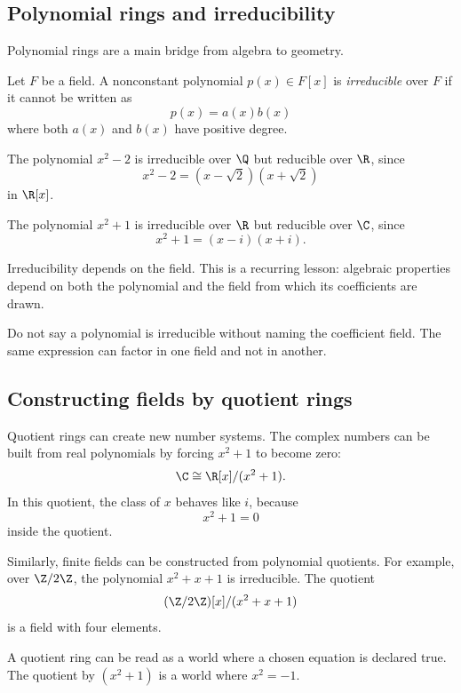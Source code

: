 \subsection{Polynomial rings and irreducibility}

Polynomial rings are a main bridge from algebra to geometry.

\begin{definition}
Let $F$ be a field. A nonconstant polynomial $p(x)\in F[x]$ is
\emph{irreducible} over $F$ if it cannot be written as
\[
p(x)=a(x)b(x)
\]
where both $a(x)$ and $b(x)$ have positive degree.
\end{definition}

\begin{example}
The polynomial $x^2-2$ is irreducible over $\Q$ but reducible over $\R$, since
\[
x^2-2=(x-\sqrt2)(x+\sqrt2)
\]
in $\R[x]$.
\end{example}

\begin{example}
The polynomial $x^2+1$ is irreducible over $\R$ but reducible over $\C$, since
\[
x^2+1=(x-i)(x+i).
\]
\end{example}

Irreducibility depends on the field. This is a recurring lesson: algebraic
properties depend on both the polynomial and the field from which its
coefficients are drawn.

\begin{trapbox}
Do not say a polynomial is irreducible without naming the coefficient field.
The same expression can factor in one field and not in another.
\end{trapbox}

\subsection{Constructing fields by quotient rings}

Quotient rings can create new number systems. The complex numbers can be built
from real polynomials by forcing $x^2+1$ to become zero:
\[
\C\cong \R[x]/(x^2+1).
\]
In this quotient, the class of $x$ behaves like $i$, because
\[
x^2+1=0
\]
inside the quotient.

Similarly, finite fields can be constructed from polynomial quotients. For
example, over $\Z/2\Z$, the polynomial $x^2+x+1$ is irreducible. The quotient
\[
(\Z/2\Z)[x]/(x^2+x+1)
\]
is a field with four elements.

\begin{intuitionbox}
A quotient ring can be read as a world where a chosen equation is declared true.
The quotient by $(x^2+1)$ is a world where $x^2=-1$.
\end{intuitionbox}

